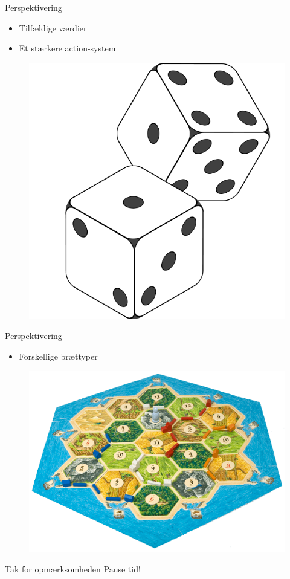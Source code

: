 \begin{frame}{Perspektivering}
  \vspace{0.5cm}
  \begin{itemize}
		\item Tilfældige værdier
		\vspace{0.1cm}
		\item Et stærkere action-system
	\end{itemize}
	\begin{figure}[H]
   			\includegraphics[scale=0.15]{billeder/2-Dice-Icon.png}
	\end{figure}	
\end{frame}

\begin{frame}{Perspektivering}
	\vspace{0.4cm}
	\begin{itemize}
		\item Forskellige brættyper
	\end{itemize}
	\begin{figure}[H]
   		\includegraphics[scale=0.3]{billeder/settlers-board2.png}
	\end{figure}	
\end{frame}

\begin{frame}{Tak for opmærksomheden}
\centering
\Huge{Pause tid!}

\end{frame}